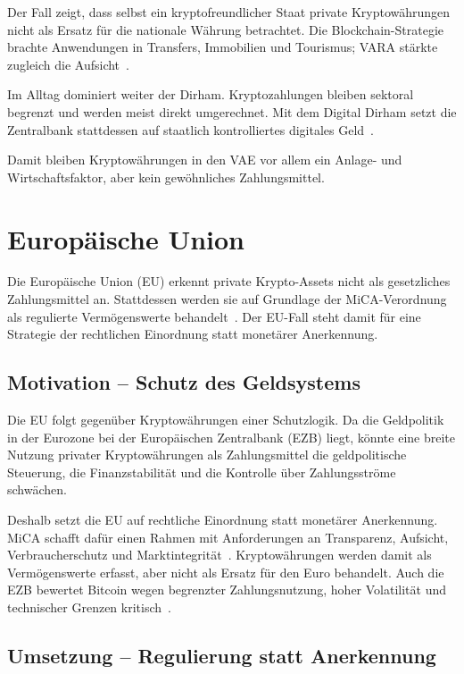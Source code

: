 Der Fall zeigt, dass selbst ein kryptofreundlicher Staat private Kryptowährungen nicht als Ersatz für die nationale Währung betrachtet. Die Blockchain-Strategie brachte Anwendungen in Transfers, Immobilien und Tourismus; VARA stärkte zugleich die Aufsicht~\cite{DubaiBlockchain2020, ElGheriani2025}.

Im Alltag dominiert weiter der Dirham. Kryptozahlungen bleiben sektoral begrenzt und werden meist direkt umgerechnet. Mit dem Digital Dirham setzt die Zentralbank stattdessen auf staatlich kontrolliertes digitales Geld~\cite{CBUAE2025}.

Damit bleiben Kryptowährungen in den VAE vor allem ein Anlage- und Wirtschaftsfaktor, aber kein gewöhnliches Zahlungsmittel.
\section{Europäische Union}

Die Europäische Union (EU) erkennt private Krypto-Assets nicht als gesetzliches Zahlungsmittel an. Stattdessen werden sie auf Grundlage der MiCA-Verordnung als regulierte Vermögenswerte behandelt~\cite{MiCA2023}. Der EU-Fall steht damit für eine Strategie der rechtlichen Einordnung statt monetärer Anerkennung.

\subsection{Motivation -- Schutz des Geldsystems}

Die EU folgt gegenüber Kryptowährungen einer Schutzlogik. Da die Geldpolitik in der Eurozone bei der Europäischen Zentralbank (EZB) liegt, könnte eine breite Nutzung privater Kryptowährungen als Zahlungsmittel die geldpolitische Steuerung, die Finanzstabilität und die Kontrolle über Zahlungsströme schwächen.

Deshalb setzt die EU auf rechtliche Einordnung statt monetärer Anerkennung. MiCA schafft dafür einen Rahmen mit Anforderungen an Transparenz, Aufsicht, Verbraucherschutz und Marktintegrität~\cite{MiCA2023}. Kryptowährungen werden damit als Vermögenswerte erfasst, aber nicht als Ersatz für den Euro behandelt. Auch die EZB bewertet Bitcoin wegen begrenzter Zahlungsnutzung, hoher Volatilität und technischer Grenzen kritisch~\cite{Bindseil2024}.

\subsection{Umsetzung -- Regulierung statt Anerkennung}

